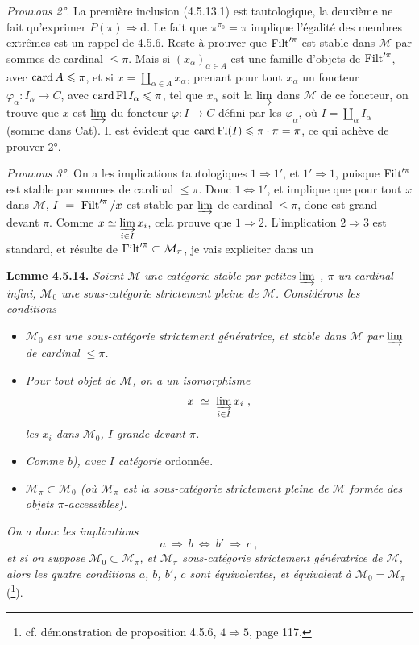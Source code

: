 \textit{Prouvons 2°.} La première inclusion (4.5.13.1) est tautologique, la deuxième ne fait qu'exprimer $P(\pi) \Longrightarrow \mathrm{d}$. Le fait que $\pi^{\pi_0} = \pi$ implique l'égalité des membres extrêmes est un rappel de 4.5.6. Reste à prouver que $\operatorname{Filt}'^{\pi}$ est stable dans $\mathcal{M}$ par sommes de cardinal $\leqslant \pi$. Mais si $(x_{\alpha})_{\alpha\in A}$ est une famille d'objets de $\operatorname{Filt}'^{\pi}$, avec $\operatorname{card} A \leqslant \pi$, et si $x = \coprod_{\alpha\in A} x_{\alpha}$, prenant pour tout $x_{\alpha}$ un foncteur $\varphi_{\alpha} : I_{\alpha} \longrightarrow C$, avec $\operatorname{card} \operatorname{Fl} I_{\alpha} \leqslant \pi$, tel que $x_{\alpha}$ soit la $\varinjlim$ dans $\mathcal{M}$ de ce foncteur, on trouve que $x$ est $\varinjlim$ du foncteur $\varphi : I \longrightarrow C$ défini par les $\varphi_{\alpha}$, où $I = \coprod_{\alpha} I_{\alpha}$ (somme dans Cat). Il est évident que $\operatorname{card} \operatorname{Fl}(I) \leqslant \pi\cdot\pi = \pi$, ce qui achève de prouver 2°.

\textit{Prouvons 3°.} On a les implications tautologiques $1 \Longrightarrow 1'$, et $1' \Longrightarrow 1$, puisque $\operatorname{Filt}'^{\pi}$ est stable par sommes de cardinal $\leqslant \pi$. Donc $1 \Longleftrightarrow 1'$, et implique que pour tout $x$ dans $\mathcal{M}$,
$I \ = \ \operatorname{Filt}'^{\pi}/x$ est stable par $\varinjlim$ de cardinal $\leqslant \pi$, donc est grand devant $\pi$. Comme $x \simeq \varinjlim\limits_{i\in I} x_i$, cela prouve que $1 \Longrightarrow 2$. L'implication $2 \Longrightarrow 3$ est standard, et résulte de $\operatorname{Filt}'^{\pi} \subset \mathcal{M}_{\pi}$, je vais expliciter dans un

\textbf{Lemme 4.5.14.} \textit{Soient $\mathcal{M}$ une catégorie stable par petites} $\varinjlim$ \textit{, $\pi$ un cardinal infini, $\mathcal{M}_0$ une sous-catégorie strictement pleine de $\mathcal{M}$. Considérons les conditions}
\begin{itemize}
\item[\textit{a)}] \textit{$\mathcal{M}_0$ est une sous-catégorie strictement génératrice, et stable dans $\mathcal{M}$ par} $\varinjlim$ \textit{de cardinal $\leqslant \pi$.}
\item[\textit{b)}] \textit{Pour tout objet de $\mathcal{M}$, on a un isomorphisme}
\[ x \ \simeq \ \varinjlim_{i\in I} x_i \ , \]
\textit{les $x_i$ dans $\mathcal{M}_0$, $I$ grande devant $\pi$.}

\item[\textit{b$'$)}] \textit{Comme b), avec $I$ catégorie} ordonnée.
\item[\textit{c)}] \textit{$\mathcal{M}_{\pi} \subset \mathcal{M}_0$ (où $\mathcal{M}_{\pi}$ est la sous-catégorie strictement pleine de $\mathcal{M}$ formée des objets $\pi$-accessibles).}
\end{itemize}
\textit{On a donc les implications}
\[ a \ \Longrightarrow \ b \ \Longleftrightarrow \ b' \ \Longrightarrow \ c \ , \]
\textit{et si on suppose $\mathcal{M}_0 \subset \mathcal{M}_{\pi}$, et $\mathcal{M}_{\pi}$ sous-catégorie strictement génératrice de $\mathcal{M}$, alors les quatre conditions $a$, $b$, $b'$, $c$ sont équivalentes, et équivalent à $\mathcal{M}_0 = \mathcal{M}_{\pi}$} (\footnote{cf. démonstration de proposition 4.5.6, $4 \Longrightarrow 5$, page 117.}).

